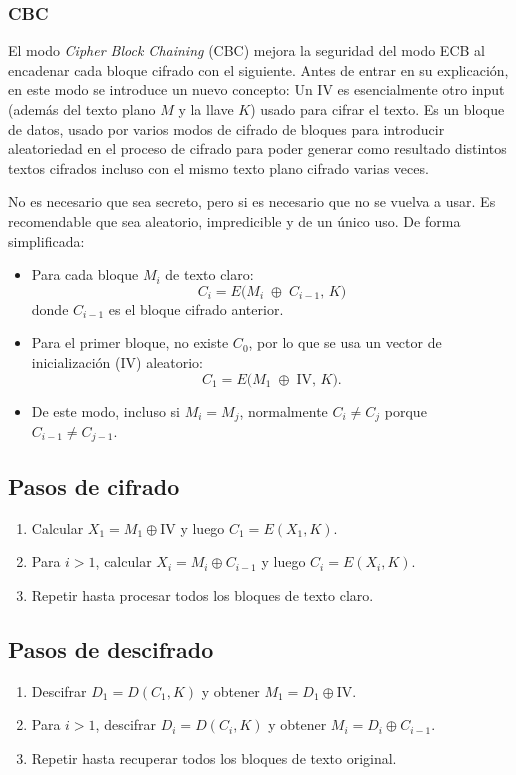 \subsubsection{CBC}
El modo \emph{Cipher Block Chaining} (CBC) mejora la seguridad del modo ECB al encadenar cada bloque cifrado con el siguiente. 
Antes de entrar en su explicación, en este modo se introduce un nuevo concepto:
Un IV es esencialmente otro input (además del texto plano $M$ y la llave $K$) usado para cifrar el texto. Es un bloque de datos, usado por varios modos de cifrado de bloques para introducir aleatoriedad en el proceso de cifrado para poder generar como resultado distintos textos cifrados incluso con el mismo texto plano cifrado varias veces.

No es necesario que sea secreto, pero si es necesario que no se vuelva a usar. Es recomendable que sea aleatorio, impredicible y de un único uso.
De forma simplificada:
\begin{itemize}
  \item Para cada bloque $M_i$ de texto claro:
    \[
      C_i = E\bigl(M_i \;\oplus\; C_{i-1},\,K\bigr)
    \]
    donde $C_{i-1}$ es el bloque cifrado anterior.
  \item Para el primer bloque, no existe $C_0$, por lo que se usa un vector de inicialización (IV) aleatorio:
    \[
      C_1 = E\bigl(M_1 \;\oplus\; \mathrm{IV},\,K\bigr).
    \]
  \item De este modo, incluso si $M_i = M_j$, normalmente $C_i \neq C_j$ porque $C_{i-1}\neq C_{j-1}$.
\end{itemize}

\subsection*{Pasos de cifrado}
\begin{enumerate}
  \item Calcular $X_1 = M_1 \oplus \mathrm{IV}$ y luego $C_1 = E(X_1, K)$.
  \item Para $i > 1$, calcular $X_i = M_i \oplus C_{i-1}$ y luego $C_i = E(X_i, K)$.
  \item Repetir hasta procesar todos los bloques de texto claro.
\end{enumerate}

\subsection*{Pasos de descifrado}
\begin{enumerate}
  \item Descifrar $D_1 = D(C_1, K)$ y obtener $M_1 = D_1 \oplus \mathrm{IV}$.
  \item Para $i > 1$, descifrar $D_i = D(C_i, K)$ y obtener $M_i = D_i \oplus C_{i-1}$.
  \item Repetir hasta recuperar todos los bloques de texto original.
\end{enumerate}

